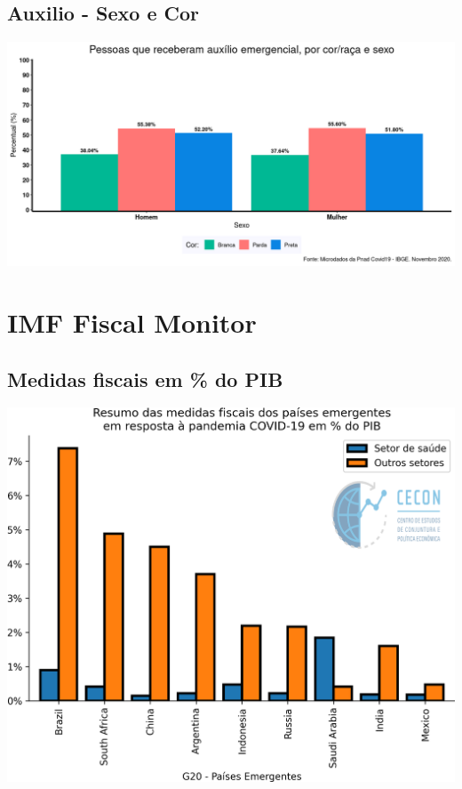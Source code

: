 \documentclass{SelfArx}
\begin{document}
\subsection*{Auxilio - Sexo e Cor}
\label{sec:org9ed5307}
\begin{center}
\includegraphics[width=.9\linewidth]{./figs/PNAD_COVID/auxilio_cor_sexo.png}
\end{center}


\section*{IMF Fiscal Monitor}
\label{sec:orgb375760}
\subsection*{Medidas fiscais em \% do PIB}
\label{sec:orgda032f7}

\begin{center}
\includegraphics[width=.9\linewidth]{./figs/IMF/FiscalMonitor_Covid.png}
\end{center}
\end{document}
